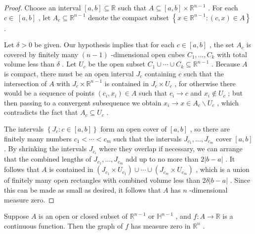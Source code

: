 \begin{proof}
\leanok
Choose an interval $\left\lbrack  {a, b}\right\rbrack   \subseteq  \mathbb{R}$ such that $A \subseteq  \left\lbrack  {a, b}\right\rbrack   \times  {\mathbb{R}}^{n - 1}$ . For each $c \in \; \left\lbrack  {a, b}\right\rbrack$ , let ${A}_{c} \subseteq  {\mathbb{R}}^{n - 1}$ denote the compact subset $\left\{  {x \in  {\mathbb{R}}^{n - 1} : \left( {c, x}\right)  \in  A}\right\}$ .

Let $\delta  > 0$ be given. Our hypothesis implies that for each $c \in  \left\lbrack  {a, b}\right\rbrack$ , the set ${A}_{c}$ is covered by finitely many $\left( {n - 1}\right)$ -dimensional open cubes ${C}_{1},\ldots ,{C}_{k}$ with total volume less than $\delta$ . Let ${U}_{c}$ be the open subset ${C}_{1} \cup  \cdots  \cup  {C}_{k} \subseteq  {\mathbb{R}}^{n - 1}$ . Because $A$ is compact, there must be an open interval ${J}_{c}$ containing $c$ such that the intersection of $A$ with ${J}_{c} \times  {\mathbb{R}}^{n - 1}$ is contained in ${J}_{c} \times  {U}_{c}$ , for otherwise there would be a sequence of points $\left( {{c}_{i},{x}_{i}}\right)  \in  A$ such that ${c}_{i} \rightarrow  c$ and ${x}_{i} \notin  {U}_{c}$ ; but then passing to a convergent subsequence we obtain ${x}_{i} \rightarrow  x \in  {A}_{c} \smallsetminus  {U}_{c}$ , which contradicts the fact that ${A}_{c} \subseteq  {U}_{c}$ .

The intervals $\left\{  {{J}_{c} : c \in  \left\lbrack  {a, b}\right\rbrack  }\right\}$ form an open cover of $\left\lbrack  {a, b}\right\rbrack$ , so there are finitely many numbers ${c}_{1} < \cdots  < {c}_{m}$ such that the intervals ${J}_{{c}_{1}},\ldots ,{J}_{{c}_{m}}$ cover $\left\lbrack  {a, b}\right\rbrack$ . By shrinking the intervals ${J}_{{c}_{i}}$ where they overlap if necessary, we can arrange that the combined lengths of ${J}_{{c}_{1}},\ldots ,{J}_{{c}_{m}}$ add up to no more than $2\left| {b - a}\right|$ . It follows that $A$ is contained in $\left( {{J}_{{c}_{1}} \times  {U}_{{c}_{1}}}\right)  \cup  \cdots  \cup  \left( {{J}_{{c}_{m}} \times  {U}_{{c}_{m}}}\right)$ , which is a union of finitely many open rectangles with combined volume less than ${2\delta }\left| {b - a}\right|$ . Since this can be made as small as desired, it follows that $A$ has $n$ -dimensional measure zero.
\end{proof}

\begin{proposition}
\label{prop:6-3}
\leanok
{}
Suppose $A$ is an open or closed subset of ${\mathbb{R}}^{n - 1}$ or ${\mathbb{H}}^{n - 1}$ , and $f : A \rightarrow  \mathbb{R}$ is a continuous function. Then the graph of $f$ has measure zero in ${\mathbb{R}}^{n}$ .
\end{proposition}

